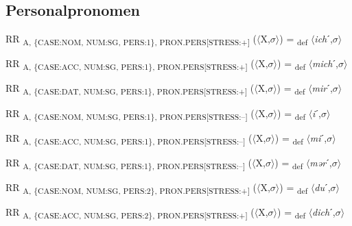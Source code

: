 {\subsection{Personalpronomen}

\begin{exe}
 RR \textsubscript{A, \{CASE:NOM, NUM:SG, PERS:1\}, PRON.PERS[STRESS:+]} ($\langle$X,$\sigma $$\rangle$) = \textsubscript{def} $\langle$\textit{ich}ˊ,$\sigma $$\rangle$
\end{exe}

\begin{exe}
 RR \textsubscript{A, \{CASE:ACC, NUM:SG, PERS:1\}, PRON.PERS[STRESS:+]} ($\langle$X,$\sigma $$\rangle$) = \textsubscript{def} $\langle$\textit{mich}ˊ,$\sigma $$\rangle$
\end{exe}

\begin{exe}
 RR \textsubscript{A, \{CASE:DAT, NUM:SG, PERS:1\}, PRON.PERS[STRESS:+]} ($\langle$X,$\sigma $$\rangle$) = \textsubscript{def} $\langle$\textit{mir}ˊ,$\sigma $$\rangle$
\end{exe}

\begin{exe}
 RR \textsubscript{A, \{CASE:NOM, NUM:SG, PERS:1\}, PRON.PERS[STRESS:–]} ($\langle$X,$\sigma $$\rangle$) = \textsubscript{def} $\langle$\textit{i}ˊ,$\sigma $$\rangle$
\end{exe}

\begin{exe}
 RR \textsubscript{A, \{CASE:ACC, NUM:SG, PERS:1\}, PRON.PERS[STRESS:–]} ($\langle$X,$\sigma $$\rangle$) = \textsubscript{def} $\langle$\textit{mi}ˊ,$\sigma $$\rangle$
\end{exe}

\begin{exe}
 RR \textsubscript{A, \{CASE:DAT, NUM:SG, PERS:1\}, PRON.PERS[STRESS:–]} ($\langle$X,$\sigma $$\rangle$) = \textsubscript{def} $\langle$\textit{mər}ˊ,$\sigma $$\rangle$
\end{exe}

\begin{exe}
 RR \textsubscript{A, \{CASE:NOM, NUM:SG, PERS:2\}, PRON.PERS[STRESS:+]} ($\langle$X,$\sigma $$\rangle$) = \textsubscript{def} $\langle$\textit{du}ˊ,$\sigma $$\rangle$
\end{exe}

\begin{exe}
 RR \textsubscript{A, \{CASE:ACC, NUM:SG, PERS:2\}, PRON.PERS[STRESS:+]} ($\langle$X,$\sigma $$\rangle$) = \textsubscript{def} $\langle$\textit{dich}ˊ,$\sigma $$\rangle$
\end{exe}

}
